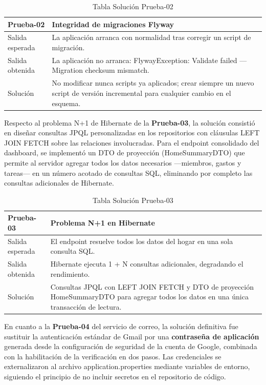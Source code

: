 \begin{table}[H]
\centering
\begin{tabular}{|p{}|p{}|}
\hline
\textbf{Prueba-02} & \textbf{Integridad de migraciones Flyway} \\ \hline
Salida esperada & La aplicación arranca con normalidad tras corregir un script de migración. \\ \hline
Salida obtenida & La aplicación no arranca: FlywayException: Validate failed --- Migration checksum mismatch. \\ \hline
Solución & No modificar nunca scripts ya aplicados; crear siempre un nuevo script de versión incremental para cualquier cambio en el esquema. \\ \hline
\end{tabular}
\caption{Tabla Solución Prueba-02}
\label{tab:sol_prueba02}
\end{table}

Respecto al problema N+1 de Hibernate de la \textbf{Prueba-03}, la solución consistió en diseñar consultas JPQL personalizadas en los repositorios con cláusulas LEFT JOIN FETCH sobre las relaciones involucradas. Para el endpoint consolidado del dashboard, se implementó un DTO de proyección (HomeSummaryDTO) que permite al servidor agregar todos los datos necesarios ---miembros, gastos y tareas--- en un número acotado de consultas SQL, eliminando por completo las consultas adicionales de Hibernate.

\begin{table}[H]
\centering
\begin{tabular}{|p{}|p{}|}
\hline
\textbf{Prueba-03} & \textbf{Problema N+1 en Hibernate} \\ \hline
Salida esperada & El endpoint resuelve todos los datos del hogar en una sola consulta SQL. \\ \hline
Salida obtenida & Hibernate ejecuta 1 + N consultas adicionales, degradando el rendimiento. \\ \hline
Solución & Consultas JPQL con LEFT JOIN FETCH y DTO de proyección HomeSummaryDTO para agregar todos los datos en una única transacción de lectura. \\ \hline
\end{tabular}
\caption{Tabla Solución Prueba-03}
\label{tab:sol_prueba03}
\end{table}

En cuanto a la \textbf{Prueba-04} del servicio de correo, la solución definitiva fue sustituir la autenticación estándar de Gmail por una \textbf{contraseña de aplicación} generada desde la configuración de seguridad de la cuenta de Google, combinada con la habilitación de la verificación en dos pasos. Las credenciales se externalizaron al archivo application.properties mediante variables de entorno, siguiendo el principio de no incluir secretos en el repositorio de código.

